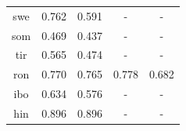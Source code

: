 \documentclass[11pt]{article}
\begin{document}
\begin{table}[]
\begin{tabular}{ccccc}
{\color[HTML]{212121} swe}          & {\color[HTML]{212121} 0.762} & {\color[HTML]{212121} 0.591} & -                            & -                            \\
{\color[HTML]{212121} som}          & {\color[HTML]{212121} 0.469} & {\color[HTML]{212121} 0.437} & -                            & -                            \\
{\color[HTML]{212121} tir}          & {\color[HTML]{212121} 0.565} & {\color[HTML]{212121} 0.474} & -                            & -                            \\
{\color[HTML]{212121} ron}          & {\color[HTML]{212121} 0.770} & {\color[HTML]{212121} 0.765} & {\color[HTML]{212121} 0.778} & {\color[HTML]{212121} 0.682} \\
{\color[HTML]{212121} ibo}          & {\color[HTML]{212121} 0.634} & {\color[HTML]{212121} 0.576} & -                            & -                            \\
{\color[HTML]{212121} hin}          & {\color[HTML]{212121} 0.896} & {\color[HTML]{212121} 0.896} & -                            & -                            \\ \hline
\end{tabular}
\end{table}
\end{document}
